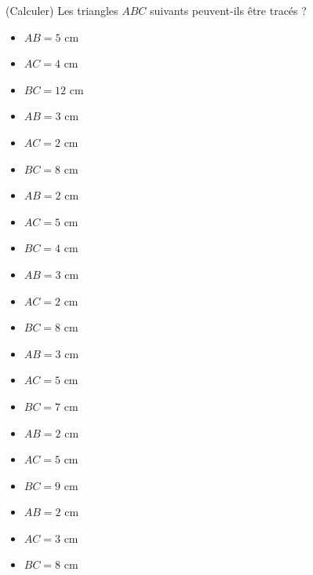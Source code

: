  (Calculer) Les triangles $ABC$ suivants peuvent-ils être tracés ?

\begin{multicols}{4}
\begin{itemize}
\item $AB=5$ cm
\item $AC=4$ cm
\item $BC=12$ cm
\end{itemize}

\begin{itemize}
\item $AB=3$ cm
\item $AC=2$ cm
\item $BC=8$ cm
\end{itemize}

\begin{itemize}
\item $AB=2$ cm
\item $AC=5$ cm
\item $BC=4$ cm
\end{itemize}\columnbreak

\begin{itemize}
\item $AB=3$ cm
\item $AC=2$ cm
\item $BC=8$ cm
\end{itemize}

\begin{itemize}
\item $AB=3$ cm
\item $AC=5$ cm
\item $BC=7$ cm
\end{itemize}

\begin{itemize}
\item $AB=2$ cm
\item $AC=5$ cm
\item $BC=9$ cm
\end{itemize}

\begin{itemize}
\item $AB=2$ cm
\item $AC=3$ cm
\item $BC=8$ cm
\end{itemize}


\end{multicols}

